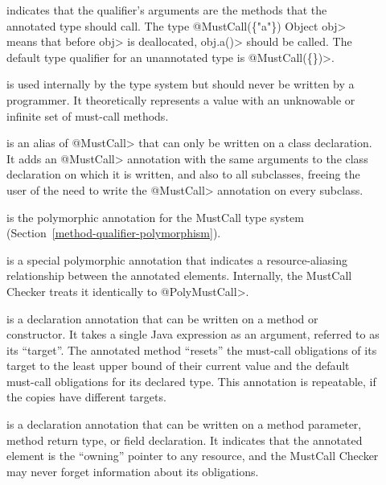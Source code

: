 \begin{description}

\item[]
  indicates that the qualifier's arguments are the methods that the annotated type
  should call. The type \<@MustCall(\{"a"\}) Object obj> means
  that before \<obj> is deallocated, \<obj.a()> should be called.
  The default type qualifier for an unannotated type is \<@MustCall(\{\})>.

\item[]
  is used internally by the type system but should never be written by a
  programmer.  It theoretically represents a value with an unknowable or infinite set
  of must-call methods.

\item[]
  is an alias of \<@MustCall> that can only be written on a class declaration. It adds an \<@MustCall>
  annotation with the same arguments to
  the class declaration on which it is written, and also to all subclasses, freeing the user of the need
  to write the \<@MustCall> annotation on every subclass.

\item[]
  is the polymorphic annotation for the MustCall type system
  (Section~\ref{method-qualifier-polymorphism}).

\item[]
  is a special polymorphic annotation that indicates a resource-aliasing relationship between
  the annotated elements. Internally, the MustCall Checker treats it identically to \<@PolyMustCall>.

\item[]
  is a declaration annotation that can be written on a method or constructor. It takes a single Java expression as an
  argument, referred to as its ``target''. The annotated method
  ``resets'' the must-call obligations of its target to the least upper bound of their current value and the default
  must-call obligations for its declared type. This annotation is repeatable, if the copies have different targets.

\item[]
  is a declaration annotation that can be written on a method parameter, method return type, or
  field declaration. It indicates that the annotated element is the ``owning'' pointer to any resource,
  and the MustCall Checker may never forget information about its obligations.


\end{description}
